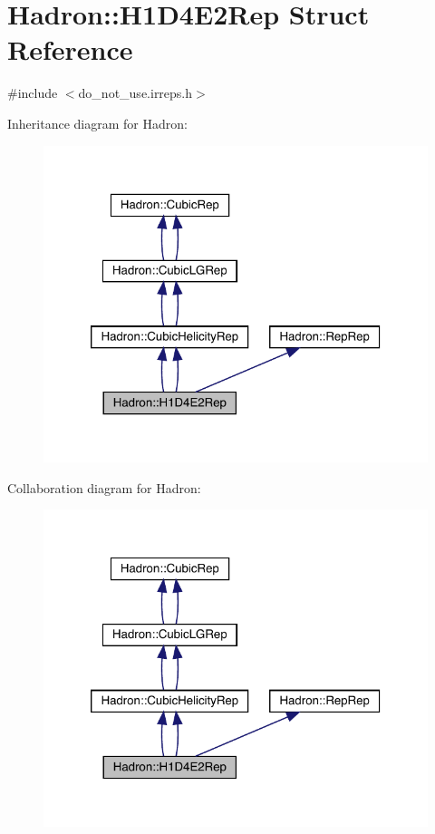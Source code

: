 \hypertarget{structHadron_1_1H1D4E2Rep}{}\section{Hadron\+:\+:H1\+D4\+E2\+Rep Struct Reference}
\label{structHadron_1_1H1D4E2Rep}


{\ttfamily \#include $<$do\+\_\+not\+\_\+use.\+irreps.\+h$>$}



Inheritance diagram for Hadron\+:\nopagebreak
\begin{figure}[H]
\begin{center}
\leavevmode
\includegraphics[width=320pt]{d9/d1c/structHadron_1_1H1D4E2Rep__inherit__graph}
\end{center}
\end{figure}


Collaboration diagram for Hadron\+:\nopagebreak
\begin{figure}[H]
\begin{center}
\leavevmode
\includegraphics[width=320pt]{dd/d6d/structHadron_1_1H1D4E2Rep__coll__graph}
\end{center}
\end{figure}
